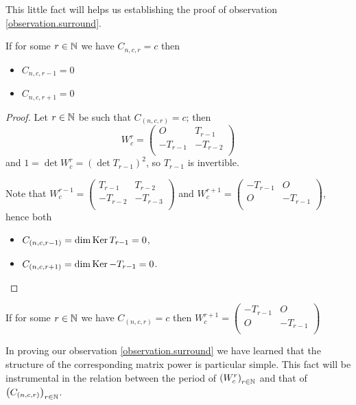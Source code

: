 This little fact will helps us establishing the proof of observation
\ref{observation.surround}.

\begin{theorem}
  If for some $r\in\mathbb{N}$ we have $C_{n,c,r} = c$ then
  \begin{itemize}
    \item $C_{n,c,r-1} = 0$
    \item $C_{n,c,r+1} = 0$
  \end{itemize}
\end{theorem}

\begin{proof}
  Let $r\in\mathbb{N}$ be such that $C_{(n,c,r)} = c$; then
  \[
  W_{c}^{r}
  =
  \left(
  \begin{array}{cc}
     O    &  T_{r-1}  \\
    -T_{r-1} & -T_{r-2} \\
  \end{array}
  \right)
  \]
  and $1 = \det W_{c}^{r} = (\det T_{r-1})^{2}$, so $T_{r-1}$ is
  invertible.

  Note that
  $W_{c}^{r-1} = \left(\begin{smallmatrix} T_{r-1} & T_{r-2} \\-T_{r-2} & -T_{r-3} \\\end{smallmatrix}\right)$
  and
  $W_{c}^{r+1} = \left(\begin{smallmatrix} -T_{r-1} & O \\ O & -T_{r-1} \\\end{smallmatrix}\right)$,
  hence both
  \begin{itemize}
    \item $C_{(n,c,r-1)} = \dim\operatorname{Ker} T_{r-1} = 0$,
    \item $C_{(n,c,r+1)} = \dim\operatorname{Ker} -T_{r-1} = 0$.
  \end{itemize}
\end{proof}

\begin{corollary}\label{block-diagonal}
  If for some $r\in\mathbb{N}$ we have $C_{(n,c,r)} = c$ then
  $W_{c}^{r+1} = \left(\begin{smallmatrix} -T_{r-1} & O \\ O & -T_{r-1} \\\end{smallmatrix}\right)$
\end{corollary}

In proving our observation \ref{observation.surround} we have learned that the
structure of the corresponding matrix power is particular simple. This fact will
be instrumental in the relation between the period of
$\left(W_{c}^{r}\right)_{r\in\mathbb{N}}$ and that of
$\left(C_{(n,c,r)}\right)_{r\in\mathbb{N}}$.

